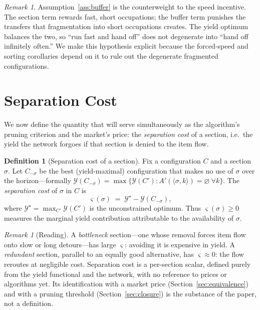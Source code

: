 \documentclass[11pt,twocolumn,a4paper]{article}
\theoremstyle{definition}
\newtheorem{definition}[theorem]{Definition}
\theoremstyle{remark}
\newtheorem{remark}[theorem]{Remark}
\newcommand{\yield}{\mathcal{Y}}
\newcommand{\sep}{\varsigma}
\begin{document}
\begin{remark}
Assumption~\ref{ass:buffer} is the counterweight to the speed incentive. The section term rewards fast, short occupations; the buffer term punishes the transfers that fragmentation into short occupations creates. The yield optimum balances the two, so ``run fast and hand off'' does not degenerate into ``hand off infinitely often.'' We make this hypothesis explicit because the forced-speed and sorting corollaries depend on it to rule out the degenerate fragmented configurations.
\end{remark}

\section{Separation Cost}
\label{sec:separation}

We now define the quantity that will serve simultaneously as the algorithm's pruning criterion and the market's price: the \emph{separation cost} of a section, i.e.\ the yield the network forgoes if that section is denied to the item flow.

\begin{definition}[Separation cost of a section]
\label{def:sepcost}
Fix a configuration $C$ and a section $\sigma$. Let $C_{-\sigma}$ be the best (yield-maximal) configuration that makes no use of $\sigma$ over the horizon---formally $\yield(C_{-\sigma}) = \max\{\yield(C') : A'(\langle\sigma,k\rangle)=\varnothing \ \forall k\}$. The \emph{separation cost} of $\sigma$ in $C$ is
\begin{equation}
\label{eq:sepcost}
\sep(\sigma) \;=\; \yield^{\star} - \yield(C_{-\sigma}),
\end{equation}
where $\yield^{\star}=\max_{C'}\yield(C')$ is the unconstrained optimum. Thus $\sep(\sigma)\ge 0$ measures the marginal yield contribution attributable to the availability of $\sigma$.
\end{definition}

\begin{remark}[Reading]
A \emph{bottleneck} section---one whose removal forces item flow onto slow or long detours---has large $\sep$: avoiding it is expensive in yield. A \emph{redundant} section, parallel to an equally good alternative, has $\sep\approx 0$: the flow reroutes at negligible cost. Separation cost is a per-section scalar, defined purely from the yield functional and the network, with no reference to prices or algorithms yet. Its identification with a market price (Section~\ref{sec:equivalence}) and with a pruning threshold (Section~\ref{sec:closure}) is the substance of the paper, not a definition.
\end{remark}
\end{document}
